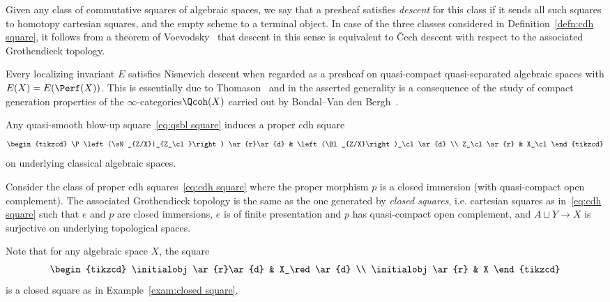 Given any class of commutative squares of algebraic spaces, we say that a presheaf satisfies \emph{descent} for this class if it sends all such squares to homotopy cartesian squares, and the empty scheme to a terminal object. In case of the three classes considered in
Definition~\ref{defn:cdh square}, it follows from a theorem of Voevodsky~\cite[Corollary~5.10]{VoevodskyCD} that descent in this sense is equivalent to Čech descent with respect to the associated Grothendieck topology.

\begin{exam}\label{exam:Nis descent for E localizing}
Every localizing invariant $E$ satisfies Nisnevich descent when regarded as a presheaf on quasi-compact quasi-separated algebraic spaces with $E(X)\linebreak= E(\Perf(X))$. This is essentially due to Thomason~\cite{ThomasonTrobaugh} and in the asserted generality is a consequence of the study of compact generation properties of the $\infty$-categories\;$\Qcoh(X)$ carried out by Bondal--Van den Bergh~\cite{BondalVDB}.
\end{exam}

\begin{exam}\label{exam:qsbl square cl}
Any quasi-smooth blow-up square~\eqref{eq:qsbl square} induces a proper cdh square
\[
\begin{tikzcd}
\P\left(\sN_{Z/X}|_{Z_\cl}\right) \ar{r}\ar{d} & \left(\Bl_{Z/X}\right)_\cl \ar{d}
\\
Z_\cl \ar{r} & X_\cl
\end{tikzcd}
\]
on underlying classical algebraic spaces.
\end{exam}

\begin{exam}\label{exam:closed square}
Consider the class of proper cdh squares~\eqref{eq:cdh square} where the proper morphism $p$ is a closed immersion (with quasi-compact open complement). The associated Grothendieck topology is the same as the one generated by \emph{closed squares}, i.e. cartesian squares as in~\eqref{eq:cdh square} such that $e$ and $p$ are closed immersions, $e$ is of finite presentation and $p$ has quasi-compact open complement, and $A \sqcup Y \to X$ is surjective on underlying topological spaces.
\end{exam}

\begin{exam}\label{exam:nil-immersion}
Note that for any algebraic space $X$, the square
\[
\begin{tikzcd}
\initialobj \ar{r}\ar{d} & X_\red \ar{d}
\\
\initialobj \ar{r} & X
\end{tikzcd}
\]
is a closed square as in Example~\ref{exam:closed square}.
\end{exam}

